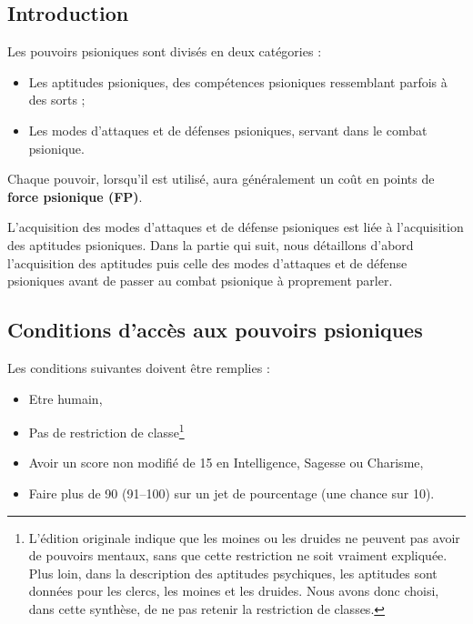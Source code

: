 \subsection*{Introduction}

Les pouvoirs psioniques sont divisés en deux catégories :

\bigskip

\begin{itemize}
\item Les aptitudes psioniques, des compétences psioniques ressemblant parfois à des sorts ;
\item Les modes d'attaques et de défenses psioniques, servant dans le combat psionique.
\end{itemize}

\bigskip

Chaque pouvoir, lorsqu'il est utilisé, aura généralement un coût en points de \textbf{force psionique (FP)}.

L'acquisition des modes d'attaques et de défense psioniques est liée à l'acquisition des aptitudes psioniques. Dans la partie qui suit, nous détaillons d'abord l'acquisition des aptitudes puis celle des modes d'attaques et de défense psioniques avant de passer au combat psionique à proprement parler.

\subsection*{Conditions d'accès aux pouvoirs psioniques}

Les conditions suivantes doivent être remplies :

\bigskip

\begin{itemize}
\item Etre humain,
\item Pas de restriction de classe\footnote{L'édition originale indique que les moines ou les druides ne peuvent pas avoir de pouvoirs mentaux, sans que cette restriction ne soit vraiment expliquée. Plus loin, dans la description des aptitudes psychiques, les aptitudes sont données pour les clercs, les moines et les druides. Nous avons donc choisi, dans cette synthèse, de ne pas retenir la restriction de classes.}
\item Avoir un score non modifié de 15 en Intelligence, Sagesse ou Charisme,
\item Faire plus de 90 (91--100) sur un jet de pourcentage (une chance sur 10).
\end{itemize}

